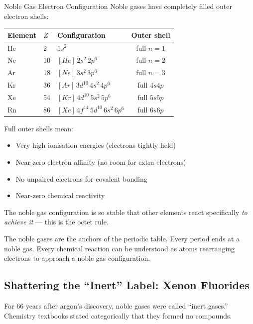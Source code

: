 \documentclass[12pt, a4paper]{book}
\begin{document}
\begin{namedconcept}{Noble Gas Electron Configuration}
Noble gases have completely filled outer electron shells:
\begin{center}
\small
\begin{tabular}{lllc}
\toprule
Element & $Z$ & Configuration & Outer shell \\
\midrule
He & 2  & $1s^2$                         & full $n=1$ \\
Ne & 10 & $[He]\,2s^2\,2p^6$             & full $n=2$ \\
Ar & 18 & $[Ne]\,3s^2\,3p^6$             & full $n=3$ \\
Kr & 36 & $[Ar]\,3d^{10}\,4s^2\,4p^6$   & full $4s4p$ \\
Xe & 54 & $[Kr]\,4d^{10}\,5s^2\,5p^6$   & full $5s5p$ \\
Rn & 86 & $[Xe]\,4f^{14}\,5d^{10}\,6s^2\,6p^6$ & full $6s6p$ \\
\bottomrule
\end{tabular}
\end{center}

Full outer shells mean:
\begin{itemize}[nosep, leftmargin=2em]
  \item Very high ionisation energies (electrons tightly held)
  \item Near-zero electron affinity (no room for extra electrons)
  \item No unpaired electrons for covalent bonding
  \item Near-zero chemical reactivity
\end{itemize}

The noble gas configuration is so stable that other elements
react specifically \emph{to achieve it} ---
this is the octet rule.
\end{namedconcept}

\vspace{0.5em}

The noble gases are the anchors of the periodic table.
Every period ends at a noble gas.
Every chemical reaction can be understood as atoms
rearranging electrons to approach a noble gas configuration.

\subsection{Shattering the ``Inert'' Label: Xenon Fluorides}

For 66 years after argon's discovery, noble gases were called
``inert gases.'' Chemistry textbooks stated categorically
that they formed no compounds.
\end{document}
